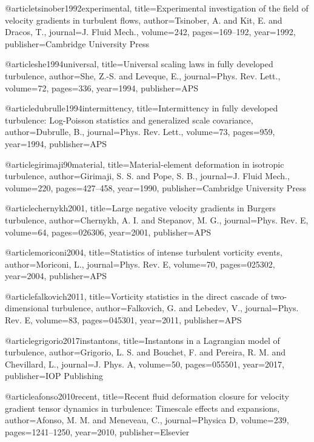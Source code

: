 @article{tsinober1992experimental,
  title={Experimental investigation of the field of velocity gradients in turbulent flows},
  author={Tsinober, A. and Kit, E. and Dracos, T.},
  journal={J. Fluid Mech.},
  volume={242},
  pages={169--192},
  year={1992},
  publisher={Cambridge University Press}
}

@article{she1994universal,
  title={Universal scaling laws in fully developed turbulence},
  author={She, Z.-S. and Leveque, E.},
  journal={Phys. Rev. Lett.},
  volume={72},
  pages={336},
  year={1994},
  publisher={APS}
}

@article{dubrulle1994intermittency,
  title={Intermittency in fully developed turbulence: Log-Poisson statistics and generalized scale covariance},
  author={Dubrulle, B.},
  journal={Phys. Rev. Lett.},
  volume={73},
  pages={959},
  year={1994},
  publisher={APS}
}

@article{girimaji90material,
  title={Material-element deformation in isotropic turbulence},
  author={Girimaji, S. S. and Pope, S. B.},
  journal={J. Fluid Mech.},
  volume={220},
  pages={427--458},
  year={1990},
  publisher={Cambridge University Press}
}

@article{chernykh2001,
  title={Large negative velocity gradients in Burgers turbulence},
  author={Chernykh, A. I. and Stepanov, M. G.},
  journal={Phys. Rev. E},
  volume={64},
  pages={026306},
  year={2001},
  publisher={APS}
}

@article{moriconi2004,
  title={Statistics of intense turbulent vorticity events},
  author={Moriconi, L.},
  journal={Phys. Rev. E},
  volume={70},
  pages={025302},
  year={2004},
  publisher={APS}
}

@article{falkovich2011,
  title={Vorticity statistics in the direct cascade of two-dimensional turbulence},
  author={Falkovich, G. and Lebedev, V.},
  journal={Phys. Rev. E},
  volume={83},
  pages={045301},
  year={2011},
  publisher={APS}
}

@article{grigorio2017instantons,
  title={Instantons in a Lagrangian model of turbulence},
  author={Grigorio, L. S. and Bouchet, F. and Pereira, R. M. and Chevillard, L.},
  journal={J. Phys. A},
  volume={50},
  pages={055501},
  year={2017},
  publisher={IOP Publishing}
}

@article{afonso2010recent,
  title={Recent fluid deformation closure for velocity gradient tensor dynamics in turbulence: Timescale effects and expansions},
  author={Afonso, M. M. and Meneveau, C.},
  journal={Physica D},
  volume={239},
  pages={1241--1250},
  year={2010},
  publisher={Elsevier}
}

